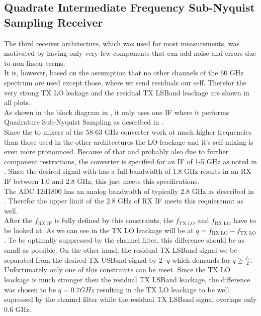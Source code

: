 \subsection{Quadrate Intermediate Frequency Sub-Nyquist Sampling Receiver}
\label{sec:rx_2}
The third receiver architecture, which was used for most measurements,
was motivated by having only very few components that can add noise
and errors due to non-linear terms. \\

It is, however, based on the assumption that no other channels of the
60 GHz spectrum are used except those, where we send residuals our self.
Therefor the very strong \gls{TX} \gls{LO} leakage and
the residual \gls{TX} \gls{LSBand} leackage are shown in all plots. \\

As shown in the block diagram in , it only uses one
\gls{IF} where it performs Quadrature Sub-Nyquist Sampling as described
in . \\

Since the to mixers of the 58-63 GHz converter work at much
higher frequencies than those used in the other architectures the
\gls{LO}-leackage and it's self-mixing is even more pronounced.
Because of that and probably also due to further component restrictions,
the converter is specified for an \gls{IF} of 1-5 GHz as noted in
.
Since the desired signal with has a full bandwidth of 1.8 GHz results
in an \gls{RX} \gls{IF} between 1.0 and 2.8 GHz, this just meets
this specifications. \\

The \gls{ADC} 12d1800 has an analog bandwidth of typically 2.8 GHz
as described in .
Therefor the upper limit of the 2.8 GHz of \gls{RX} \gls{IF} meets this
requieremnt as well. \\

After the $f_{\text{RX IF}}$ is fully defined by this constraints, the
$f_{\text{TX LO}}$ and $f_{\text{RX LO}}$ have to be looked at.
As we can see in  the \gls{TX} \gls{LO}
leackage will be at $q = f_{\text{RX LO}} - f_{\text{TX LO}}$. Te be optimally
suppressed by the channel filter, this difference should be as small
as possible. On the other hand, the residual \gls{TX} \gls{LSBand} signal
we be separated from the desired \gls{TX} \gls{USBand} signal by $2 \cdot q$
which demands for $q \geq \frac{f_s}{2}$. \\
Unfortunately only one of this constraints can be meet. Since the \gls{TX}
\gls{LO} leackage is much stronger then the residual \gls{TX} \gls{LSBand}
leackage, the difference was chosen to be $q = 0.7 GHz$ resulting in the
\gls{TX} \gls{LO} leackage to be well supressed by the channel filter while
the residual \gls{TX} \gls{LSBand} signal overlaps only 0.6 GHz. \\

